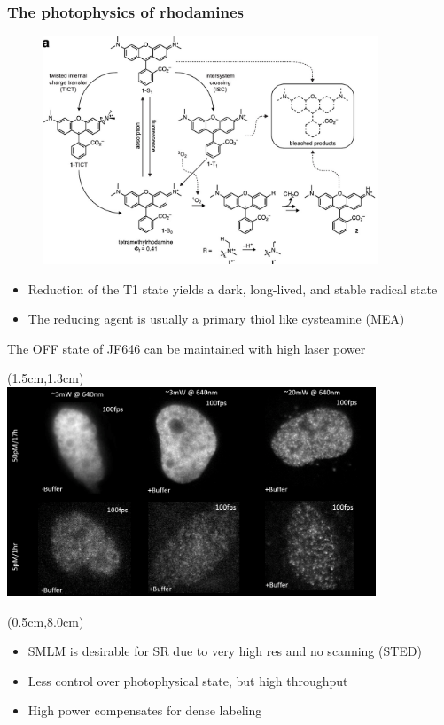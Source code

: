 \documentclass{beamer}					%
\begin{document}
\begin{frame}
\frametitle{The photophysics of rhodamines}

\begin{figure}
\includegraphics[width=10cm]{Rhodamines.png}
\end{figure}
\begin{itemize}
\item  Reduction of the T1 state yields a dark, long-lived, and stable radical state
\item The reducing agent is usually a primary thiol like cysteamine (MEA)
\end{itemize}
\end{frame}

\begin{frame}{The OFF state of JF646 can be maintained with high laser power}
\begin{textblock*}{11cm}(1.5cm,1.3cm)
\includegraphics[width=11cm]{Laser.png}
\end{textblock*}
\begin{textblock*}{\textwidth}(0.5cm,8.0cm)
\begin{itemize}
\item SMLM is desirable for SR due to very high res and no scanning (STED)
\item Less control over photophysical state, but high throughput
\item High power compensates for dense labeling
\end{itemize}
\end{textblock*}
\end{frame}
\end{document}
